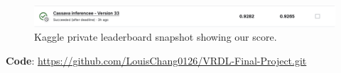 \documentclass[10pt,conference]{IEEEtran}
\begin{document}
\begin{figure}[t]
\includegraphics[width=0.9\linewidth]{leaderboard.png}
\caption{Kaggle private leaderboard snapshot showing our score.}
\end{figure}

\noindent\textbf{Code}: \url{https://github.com/LouisChang0126/VRDL-Final-Project.git}
\end{document}
